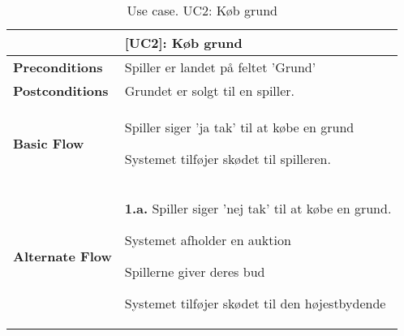 \documentclass[class=article, crop=false]{standalone}
\begin{document}
        \begin{table}[H]
            \caption{Use case. UC2: Køb grund}
            \begin{tabularx}{\textwidth}{|l|X|}
                \hline
                & \textbf{[UC2]: Køb grund}   \\ \hline
                \textbf{Preconditions}       & Spiller er landet på feltet 'Grund'\\ \hline
                \textbf{Postconditions}      & Grundet er solgt til en spiller.\\ \hline


                \textbf{Basic Flow} & \begin{tabenum}
                                          \item Spiller siger 'ja tak' til at købe en grund
                                          \item Systemet tilføjer skødet til spilleren.
                \end{tabenum}   \\ \hline




                \textbf{Alternate Flow}   & \textbf{1.a.} Spiller siger 'nej tak' til at købe en grund.
                \begin{enumerate} \begin{tabenum}
                                      \item Systemet afholder en auktion
                                      \item Spillerne giver deres bud
                                      \item Systemet tilføjer skødet til den højestbydende
                \end{tabenum} \end{enumerate}
                \\



                \hline

            \end{tabularx}


        \end{table}

    
\end{document}
